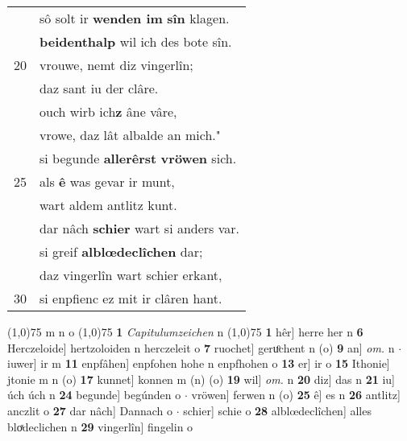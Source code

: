 \documentclass[8pt,a4paper,notitlepage]{article}
\begin{document}
\begin{table}[ht]
\begin{minipage}[t]{0.5\linewidth}
\begin{tabular}{rl}
 & sô solt ir \textbf{wenden im} \textbf{sîn} klagen.\\ 
 & \textbf{beidenthalp} wil ich des bote sîn.\\ 
20 & vrouwe, nemt diz vingerlîn;\\ 
 & daz sant iu der clâre.\\ 
 & ouch wirb ich\textbf{z} âne vâre,\\ 
 & vrowe, daz lât albalde an mich."\\ 
 & si begunde \textbf{allerêrst} \textbf{vröwen} sich.\\ 
25 & als \textbf{ê} was gevar ir munt,\\ 
 & wart aldem antlitz kunt.\\ 
 & dar nâch \textbf{schier} wart si anders var.\\ 
 & si greif \textbf{al}\textbf{blœdeclîchen} dar;\\ 
 & daz vingerlîn wart schier erkant,\\ 
30 & si enpfienc ez mit ir clâren hant.\\ 
\end{tabular}
\scriptsize
\line(1,0){75} \newline
m n o \newline
\line(1,0){75} \newline
\textbf{1} \textit{Capitulumzeichen} n  \newline
\line(1,0){75} \newline
\textbf{1} hêr] herre her n \textbf{6} Herczeloide] hertzoloiden n herczeleit o \textbf{7} ruochet] geruͦchent n (o) \textbf{9} an] \textit{om.} n  $\cdot$ iuwer] ir m \textbf{11} enpfâhen] enpfohen hohe n enpfhohen o \textbf{13} er] ir o \textbf{15} Ithonie] jtonie m n (o) \textbf{17} kunnet] konnen m (n) (o) \textbf{19} wil] \textit{om.} n \textbf{20} diz] das n \textbf{21} iu] úch úch n \textbf{24} begunde] begúnden o  $\cdot$ vröwen] ferwen n (o) \textbf{25} ê] es n \textbf{26} antlitz] anczlit o \textbf{27} dar nâch] Dannach o  $\cdot$ schier] schie o \textbf{28} alblœdeclîchen] alles bloͯdeclichen n \textbf{29} vingerlîn] fingelin o \newline
\end{minipage}
\end{table}
\newpage
\end{document}
